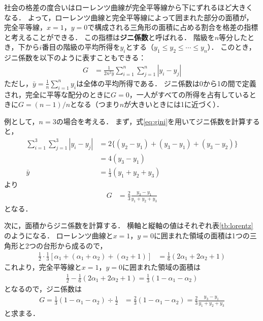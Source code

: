 %
社会の格差の度合いはローレンツ曲線が完全平等線から下にずれるほど大きくなる．
%
よって，ローレンツ曲線と完全平等線によって囲まれた部分の面積が，完全平等線，$ x=1 $，$ y=0 $で構成される三角形の面積に占める割合を格差の指標と考えることができる．
%
この指標は\textbf{ジニ係数}と呼ばれる．
%
階級を$ n $等分したとき，下から$ i $番目の階級の平均所得を$ y_{i} $とする（$ y_{1}\leq y_{2} \leq \cdots \leq y_{n} $）．
%
このとき，ジニ係数を以下のように表すこともできる：
%
\begin{align}
	G &= \frac{1}{2n^{2} \bar{y}} \sum_{i=1}^{n} \sum_{j=1}^{n} |y_{i} - y_{j}|
	\label{eq:gini}
\end{align}
%
ただし，$ \bar{y} = \frac{1}{n} \sum_{i=1}^{n} y_{i} $は全体の平均所得である．
%
ジニ係数は0から1の間で定義され，完全に平等な配分のときに$ G=0 $，一人がすべての所得を占有しているときに$ G=(n-1)/n $となる（つまり$ n $が大きいときには1に近づく）．
%

%
例として，$ n=3 $の場合を考える．
%
まず，式\eqref{eq:gini}を用いてジニ係数を計算すると，
%
\begin{align*}
	\sum_{i=1}^{3}\sum_{j=1}^{3} |y_{i}-y_{j}|
	&= 2\{(y_{2}-y_{1})+(y_{3}-y_{1})+(y_{3}-y_{2})\} \\
	&= 4(y_{3}-y_{1}) \\
	\bar{y} &= \frac{1}{3} (y_{1}+y_{2}+y_{3})
\end{align*}
%
より
%
\begin{align*}
	G &= \frac{2}{3} \frac{y_{3}-y_{1}}{y_{1}+y_{2}+y_{3}}
\end{align*}
%
となる．
%

%
次に，面積からジニ係数を計算する．
%
横軸と縦軸の値はそれぞれ表\ref{tb:lorentz}のようになる．
%
ローレンツ曲線と$ x=1 $，$ y=0 $に囲まれた領域の面積は1つの三角形と2つの台形から成るので，
%
\begin{align*}
	\frac{1}{2}\cdot\frac{1}{3} \left[\alpha_{1}+(\alpha_{1}+\alpha_{2})+(\alpha_{2}+1)\right]
	&= \frac{1}{6}(2\alpha_{1}+2\alpha_{2}+1)
\end{align*}
%
これより，完全平等線と$ x=1 $，$ y=0 $に囲まれた領域の面積は
%
\begin{align*}
	\frac{1}{2} - \frac{1}{6}(2\alpha_{1}+2\alpha_{2}+1) = \frac{1}{3} (1-\alpha_{1}-\alpha_{2})
\end{align*}
%
となるので，ジニ係数は
%
\begin{align*}
	G = \frac{1}{3} (1-\alpha_{1}-\alpha_{2}) \div \frac{1}{2} &= \frac{2}{3} (1-\alpha_{1}-\alpha_{2}) = \frac{2}{3} \frac{y_{3}-y_{1}}{y_{1}+y_{2}+y_{3}}
\end{align*}
%
と求まる．
%

